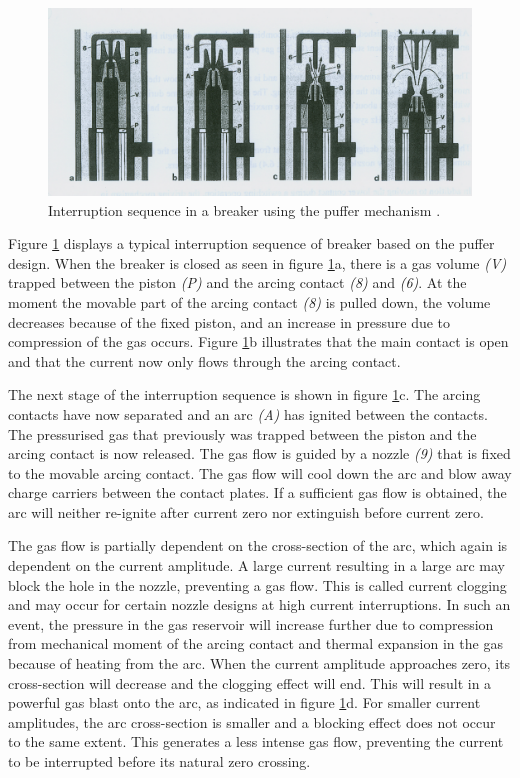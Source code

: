 \documentclass[10pt,a4paper,twoside]{article}
\begin{document}
\begin{figure} [H]
\centering
\includegraphics[scale=0.9]{Bilder/Theory/CircutBreakPuff1.png}
\caption{Interruption sequence in a breaker using the puffer mechanism \cite{bib:HVEbreak}.} \label{fig:CircutBreakPuff1}
\end{figure}

Figure \ref{fig:CircutBreakPuff1} displays a typical interruption sequence of breaker based on the puffer design. When the breaker is closed as seen in figure \ref{fig:CircutBreakPuff1}a, there is a gas volume \textit{(V)} trapped between the piston \textit{(P)} and the arcing contact \textit{(8)} and \textit{(6)}. At the moment the movable part of the arcing contact \textit{(8)} is pulled down, the volume decreases because of the fixed piston, and an increase in pressure due to compression of the gas occurs. Figure \ref{fig:CircutBreakPuff1}b illustrates that the main contact is open and that the current now only flows through the arcing contact.

The next stage of the interruption sequence is shown in figure \ref{fig:CircutBreakPuff1}c. The arcing contacts have now separated and an arc \textit{(A)} has ignited between the contacts. The pressurised gas that previously was trapped between the piston and the arcing contact is now released. The gas flow is guided by a nozzle \textit{(9)} that is fixed to the movable arcing contact. The gas flow will cool down the arc and blow away charge carriers between the contact plates. If a sufficient gas flow is obtained, the arc will neither re-ignite after current zero nor extinguish before current zero.

The gas flow is partially dependent on the cross-section of the arc, which again is dependent on the current amplitude. A large current resulting in a large arc may block the hole in the nozzle, preventing a gas flow. This is called current clogging and may occur for certain nozzle designs at high current interruptions. In such an event, the pressure in the gas reservoir will increase further due to compression from mechanical moment of the arcing contact and thermal expansion in the gas because of heating from the arc. When the current amplitude approaches zero, its cross-section will decrease and the clogging effect will end. This will result in a powerful gas blast onto the arc, as indicated in figure \ref{fig:CircutBreakPuff1}d. For smaller current amplitudes, the arc cross-section is smaller and a blocking effect does not occur to the same extent. This generates a less intense gas flow, preventing the current to be interrupted before its natural zero crossing.
\end{document}
